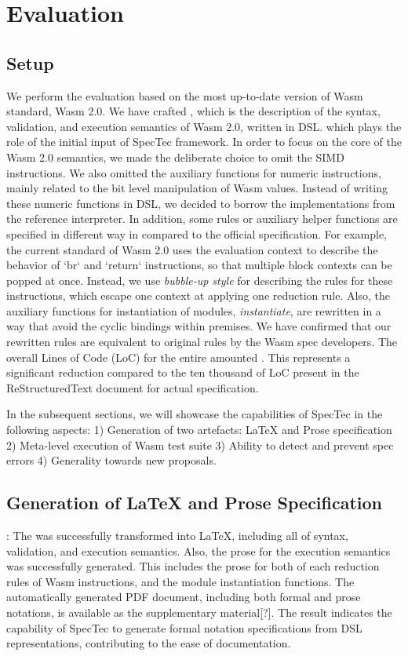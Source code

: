 \section{Evaluation}
\label{sec:eval}

\subsection{Setup}
We perform the evaluation based on the most up-to-date version of Wasm
standard, Wasm 2.0. We have crafted \specdsl, which is the description of the
syntax, validation, and execution semantics of Wasm 2.0, written in DSL.
which plays the role of the initial input of SpecTec framework.
In order to focus on the core of the Wasm 2.0 semantics,  we made
the deliberate choice to omit the SIMD instructions. We also omitted the
auxiliary functions for numeric instructions, mainly related to the bit level
manipulation of Wasm values. Instead of writing these numeric functions in DSL,
we decided to borrow the implementations from the reference interpreter.
In addition, some rules or auxiliary helper functions are specified in
different way in \specdsl compared to the official specification.  For
example, the current standard of Wasm 2.0 uses the evaluation context to
describe the behavior of `br` and `return` instructions, so that multiple block
contexts can be popped at once. Instead, we use \textit{bubble-up style} for
describing the rules for these instructions, which escape one context at
applying one reduction rule. Also, the auxiliary functions for instantiation
of modules, \textit{instantiate}, are rewritten in a way that avoid the cyclic
bindings within premises. We have confirmed that our rewritten rules are
equivalent to original rules by the Wasm spec developers.  The overall Lines of
Code (LoC) for the entire \specdsl amounted . This represents a
significant reduction compared to the ten thousand of LoC present in the
ReStructuredText document for actual specification.

In the subsequent sections, we will showcase the capabilities of SpecTec in the following aspects:
1) Generation of two artefacts: LaTeX and Prose specification
2) Meta-level execution of Wasm test suite
3) Ability to detect and prevent spec errors
4) Generality towards new proposals.

\subsection{Generation of LaTeX and Prose Specification}:
The \specdsl was successfully transformed into LaTeX, including all of syntax,
validation, and execution semantics.  Also, the prose for the execution
semantics was successfully generated.  This includes the prose for both of each
reduction rules of Wasm instructions, and the module instantiation functions.
The automatically generated PDF document, including both formal and prose
notations, is available as the supplementary material[?].  The result indicates
the capability of SpecTec to generate formal notation specifications from DSL
representations, contributing to the ease of documentation.


